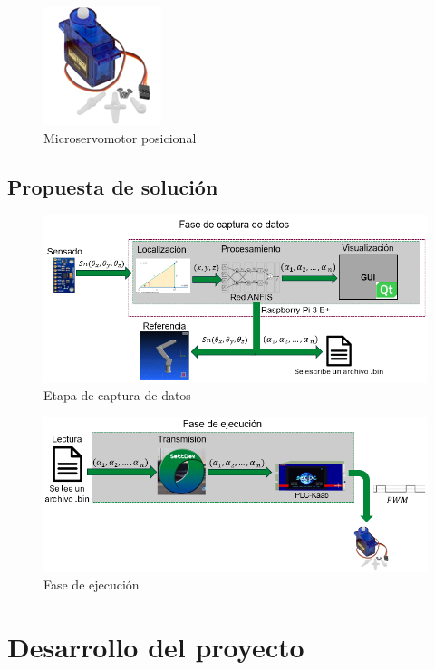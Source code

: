 \documentclass[12pt, twoside]{report}
\begin{document}
\begin{figure}[htb]
	\centering
	\includegraphics[scale=0.6]{servomotor.png}
	\caption{Microservomotor posicional}
\end{figure}

\newpage
\section{Propuesta de solución}

\begin{figure}[htb]
	\centering
	\includegraphics[scale=0.85]{fasecaptura.png}
	\caption{Etapa de captura de datos}
\end{figure}

\begin{figure}[htb]
	\centering
	\includegraphics[scale=0.85]{faseejecucion.png}
	\caption{Fase de ejecución}
\end{figure}

\newpage
\chapter{Desarrollo del proyecto}
\end{document}
